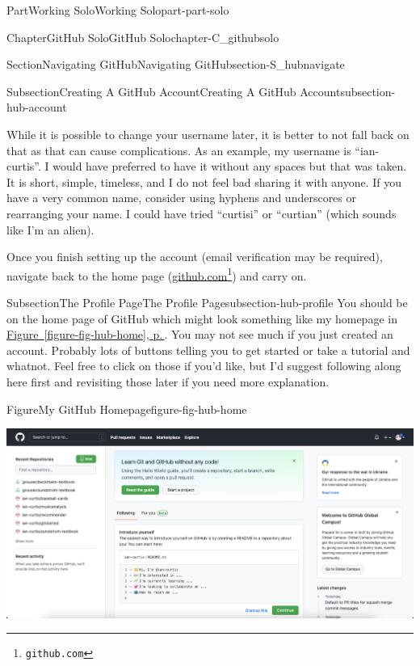 \documentclass[twoside,10pt,]{book}
\newcommand{\xreffont}{\relax}
\begin{document}
\begin{partptx}{Part}{Working Solo}{}{Working Solo}{}{}{part-part-solo}
\begin{chapterptx}{Chapter}{GitHub Solo}{}{GitHub Solo}{}{}{chapter-C_githubsolo}
\begin{sectionptx}{Section}{Navigating GitHub}{}{Navigating GitHub}{}{}{section-S_hubnavigate}
\begin{subsectionptx}{Subsection}{Creating A GitHub Account}{}{Creating A GitHub Account}{}{}{subsection-hub-account}
\begin{enumerate}
\begin{itemize}[label=\textbullet]
\end{itemize}
While it is possible to change your username later, it is better to not fall back on that as that can cause complications. As an example, my username is ``ian-curtis''. I would have preferred to have it without any spaces but that was taken. It is short, simple, timeless, and I do not feel bad sharing it with anyone. If you have a very common name, consider using hyphens and underscores or rearranging your name. I could have tried ``curtisi'' or ``curtian'' (which sounds like I'm an alien).%
\end{enumerate}
%
\par
Once you finish setting up the account (email verification may be required), navigate back to the home page (\href{https://github.com}{github.com}\footnote{\nolinkurl{github.com}\label{fn-hub-account-f-b}}) and carry on.%
\end{subsectionptx}
%
%
\typeout{************************************************}
\typeout{************************************************}
%
\begin{subsectionptx}{Subsection}{The Profile Page}{}{The Profile Page}{}{}{subsection-hub-profile}
%
%
%
%
%
You should be on the home page of GitHub which might look something like my homepage in \hyperref[figure-fig-hub-home]{Figure~{\xreffont\ref{figure-fig-hub-home}}, p.\,\pageref{figure-fig-hub-home}}. You may not see much if you just created an account. Probably lots of buttons telling you to get started or take a tutorial and whatnot. Feel free to click on those if you'd like, but I'd suggest following along here first and revisiting those later if you need more explanation.%
\begin{figureptx}{Figure}{My GitHub Homepage}{figure-fig-hub-home}{}%
\begin{image}{0.05}{0.9}{0.05}{}%
\includegraphics[width=\linewidth]{external/hub_home.pdf}

\end{image}
\end{figureptx}
\end{subsectionptx}
\end{sectionptx}
\end{chapterptx}
\end{partptx}
\end{document}
